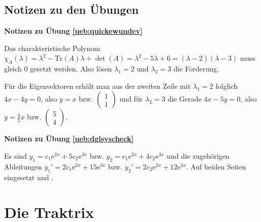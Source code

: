 \documentclass[%
11pt,%
twoside,%
titlepage,%
swissgerman,%
headsepline%
]{scrartcl}
\newcommand{\faReturnGray}{\textcolor{gray}{\faMailReply}} %
\theoremstyle{definition}
\theoremstyle{plain}
\newcommand{\concatueb}[1]{ueb:#1}%
\newcommand{\concatlsg}[1]{lsg:#1}%
\newenvironment{lsg}[1]{%
    \par\noindent\textbf{Notizen zu Übung \ref{\concatueb{#1}}}\label{\concatlsg{#1}}
    \hfill\hyperref[\concatueb{#1}]{\faReturnGray}\par %
}{%
    \par%
}
\begin{document}
\clearpage

\subsection{Notizen zu den Übungen}

\begin{lsg}{quickewundev}
    Das charakteristische Polynom $\chi_A(\lambda)=\lambda^2-\mathrm{Tr}(A)\lambda+\det(A)=\lambda^2-5\lambda+6=(\lambda -2)(\lambda-3)$ muss gleich $0$ gesetzt werden. Also lösen $\lambda_1=2$ und $\lambda_2=3$ die Forderung.

    Für die Eigenvektoren erhält man aus der zweiten Zeile mit $\lambda_1=2$ folglich $4x-4y=0$, also $y=x$ bzw. $\begin{pmatrix}
        1\\1
    \end{pmatrix}$ und für $\lambda_2=3$ die Gerade $4x-5y=0$, also $y=\frac{4}{5}x$ bzw. $\begin{pmatrix}
        5\\4
    \end{pmatrix}$.
\end{lsg}
\begin{lsg}{dglsyscheck}
    Es sind $y_1=c_1\mathrm{e}^{2x}+5c_2\mathrm{e}^{3x}$ bzw. $y_2=c_1\mathrm{e}^{2x}+4c_2\mathrm{e}^{3x}$ und die zugehörigen Ableitungen $y_1'=2c_1\mathrm{e}^{2x}+15\mathrm{e}^{3x}$ bzw. $y_2'=2c_2\mathrm{e}^{2x}+12\mathrm{e}^{3x}$. Auf beiden Seiten eingesetzt und \checkmark.
\end{lsg}

\clearpage

\section{Die Traktrix}
\end{document}
